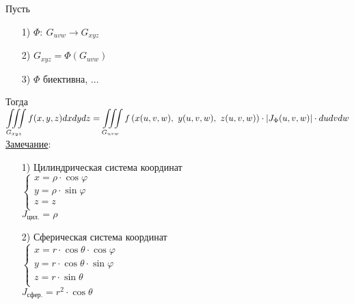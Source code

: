 
Пусть
\begin{enumerate}
\item[1)] $\Phi: \ G_{uvw} \to G_{xyz}$ \\

\item[2)] $G_{xyz} = \Phi (G_{uvw})$ \\

\item[3)] $\Phi$ биективна, ...
\end{enumerate}
Тогда \\
$\displaystyle   \iiint\limits_{G_{xyz}} f(x,y,z) dxdydz = 
\iiint\limits_{G_{uvw}} f \left(x (u,v,w), \ y(u,v,w), \ z(u,v,w) \right) \cdot \left| J_\Phi (u,v,w) \right| \cdot dudvdw$ \\


\underline{Замечание}: \\
\begin{enumerate}
\item[1)] Цилиндрическая система координат \\
$\begin{cases} 
	x = \rho \cdot \cos{\varphi} \\
	y = \rho \cdot \sin{\varphi} \\
	z = z \\
\end{cases}$ \\
$J_\text{цил.} = \rho$ \\

\item[2)] Сферическая система координат \\
$\begin{cases}
	x = r \cdot \cos{\theta} \cdot \cos{\varphi} \\
	y = r \cdot \cos{\theta} \cdot \sin{\varphi} \\
	z = r \cdot \sin{\theta} \\
\end{cases}$ \\
$J_\text{сфер.} = r^2 \cdot \cos{\theta}$ \\
\end{enumerate}


